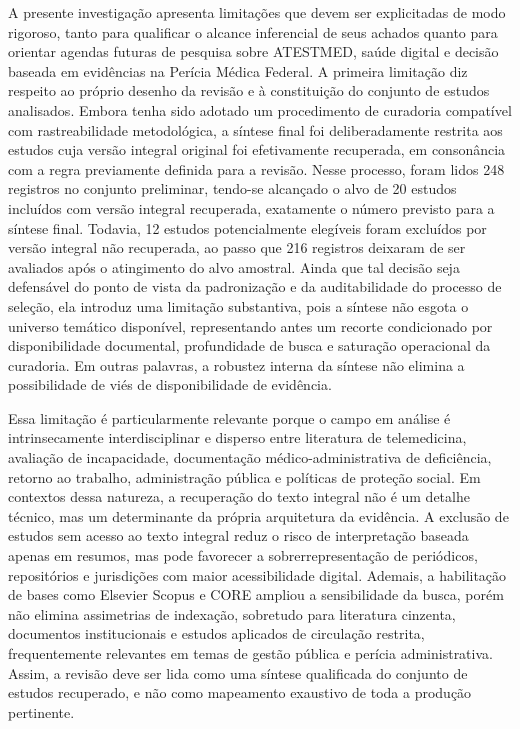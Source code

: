 \documentclass[12pt,a4paper]{article}
\begin{document}
A presente investigação apresenta limitações que devem ser explicitadas de modo rigoroso, tanto para qualificar o alcance inferencial de seus achados quanto para orientar agendas futuras de pesquisa sobre ATESTMED, saúde digital e decisão baseada em evidências na Perícia Médica Federal. A primeira limitação diz respeito ao próprio desenho da revisão e à constituição do conjunto de estudos analisados. Embora tenha sido adotado um procedimento de curadoria compatível com rastreabilidade metodológica, a síntese final foi deliberadamente restrita aos estudos cuja versão integral original foi efetivamente recuperada, em consonância com a regra previamente definida para a revisão. Nesse processo, foram lidos 248 registros no conjunto preliminar, tendo-se alcançado o alvo de 20 estudos incluídos com versão integral recuperada, exatamente o número previsto para a síntese final. Todavia, 12 estudos potencialmente elegíveis foram excluídos por versão integral não recuperada, ao passo que 216 registros deixaram de ser avaliados após o atingimento do alvo amostral. Ainda que tal decisão seja defensável do ponto de vista da padronização e da auditabilidade do processo de seleção, ela introduz uma limitação substantiva, pois a síntese não esgota o universo temático disponível, representando antes um recorte condicionado por disponibilidade documental, profundidade de busca e saturação operacional da curadoria. Em outras palavras, a robustez interna da síntese não elimina a possibilidade de viés de disponibilidade de evidência.

Essa limitação é particularmente relevante porque o campo em análise é intrinsecamente interdisciplinar e disperso entre literatura de telemedicina, avaliação de incapacidade, documentação médico-administrativa de deficiência, retorno ao trabalho, administração pública e políticas de proteção social. Em contextos dessa natureza, a recuperação do texto integral não é um detalhe técnico, mas um determinante da própria arquitetura da evidência. A exclusão de estudos sem acesso ao texto integral reduz o risco de interpretação baseada apenas em resumos, mas pode favorecer a sobrerrepresentação de periódicos, repositórios e jurisdições com maior acessibilidade digital. Ademais, a habilitação de bases como Elsevier Scopus e CORE ampliou a sensibilidade da busca, porém não elimina assimetrias de indexação, sobretudo para literatura cinzenta, documentos institucionais e estudos aplicados de circulação restrita, frequentemente relevantes em temas de gestão pública e perícia administrativa. Assim, a revisão deve ser lida como uma síntese qualificada do conjunto de estudos recuperado, e não como mapeamento exaustivo de toda a produção pertinente.
\end{document}

